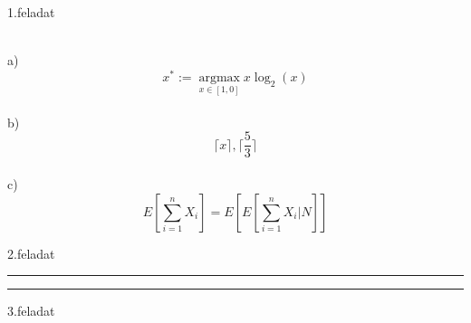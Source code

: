 \documentclass{article}
\DeclareMathOperator{\argmax}{arg max}
\newenvironment{sajat}[1]%
{\vspace{1ex}\hrule\vspace{1ex}%
\begin{center}\end{center}}%
{\vspace{1ex}\hrule\vspace{1ex}}
\newcounter{kgitem}
\begin{document}
\begin{huge}
1.feladat
\end{huge}
\\
a)
\[
x^* := \underset{x \in [1,0]}{\argmax} x \log_{2}(x)
\]
\\
b)
\[
\lceil x \rceil , \lceil \frac{5}{3} \rceil
\]
\\
c)
\[
E \left[\sum_{i=1}^n X_i \right] = E \left[E\left[ \sum_{i=1}^n X_i \bigg\vert N \right]\right]
\]

\clearpage
\begin{huge}
2.feladat
\end{huge}
\begin{sajat}{Title}
\lipsum[1]
\end{sajat}
\clearpage

\begin{huge}
3.feladat
\end{huge}
\kgitem
\end{document}

